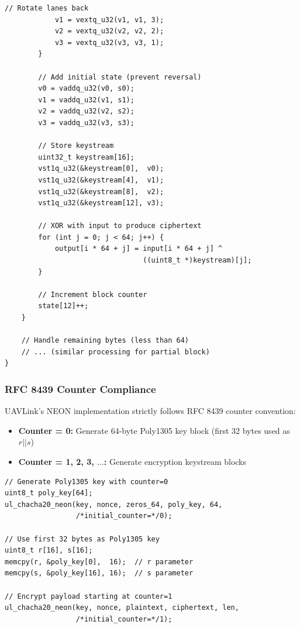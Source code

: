 \documentclass[11pt,a4paper]{article}
\begin{document}
\begin{lstlisting}[caption={NEON ChaCha20 Block Processing}]
            // Rotate lanes back
            v1 = vextq_u32(v1, v1, 3);
            v2 = vextq_u32(v2, v2, 2);
            v3 = vextq_u32(v3, v3, 1);
        }

        // Add initial state (prevent reversal)
        v0 = vaddq_u32(v0, s0);
        v1 = vaddq_u32(v1, s1);
        v2 = vaddq_u32(v2, s2);
        v3 = vaddq_u32(v3, s3);

        // Store keystream
        uint32_t keystream[16];
        vst1q_u32(&keystream[0],  v0);
        vst1q_u32(&keystream[4],  v1);
        vst1q_u32(&keystream[8],  v2);
        vst1q_u32(&keystream[12], v3);

        // XOR with input to produce ciphertext
        for (int j = 0; j < 64; j++) {
            output[i * 64 + j] = input[i * 64 + j] ^ 
                                 ((uint8_t *)keystream)[j];
        }

        // Increment block counter
        state[12]++;
    }

    // Handle remaining bytes (less than 64)
    // ... (similar processing for partial block)
}
\end{lstlisting}

\subsubsection{RFC 8439 Counter Compliance}

UAVLink's NEON implementation strictly follows RFC 8439 counter convention:

\begin{itemize}[noitemsep]
    \item \textbf{Counter = 0:} Generate 64-byte Poly1305 key block (first 32 bytes used as $r||s$)
    \item \textbf{Counter = 1, 2, 3, $\ldots$:} Generate encryption keystream blocks
\end{itemize}

\begin{lstlisting}[caption={AEAD Poly1305 Key Generation}]
// Generate Poly1305 key with counter=0
uint8_t poly_key[64];
ul_chacha20_neon(key, nonce, zeros_64, poly_key, 64, 
                 /*initial_counter=*/0);

// Use first 32 bytes as Poly1305 key
uint8_t r[16], s[16];
memcpy(r, &poly_key[0],  16);  // r parameter
memcpy(s, &poly_key[16], 16);  // s parameter

// Encrypt payload starting at counter=1
ul_chacha20_neon(key, nonce, plaintext, ciphertext, len, 
                 /*initial_counter=*/1);
\end{lstlisting}
\end{document}

